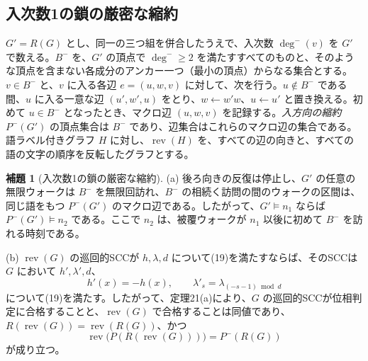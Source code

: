 \documentclass[11pt,reqno]{amsart}
\theoremstyle{definition}
\newtheorem{lemma}[theorem]{補題}
\theoremstyle{definition}
\theoremstyle{remark}
\begin{document}
\subsection{入次数1の鎖の厳密な縮約}\label{sec:F.2}

\(G'=R(G)\) とし、同一の三つ組を併合したうえで、入次数 \(\deg^-(v)\) を \(G'\) で数える。\(B^-\) を、\(G'\) の頂点で \(\deg^-\ge2\) を満たすすべてのものと、そのような頂点を含まない各成分のアンカー一つ（最小の頂点）からなる集合とする。\(v\in B^-\) と、\(v\) に入る各辺 \(e=(u,w,v)\) に対して、次を行う。\(u\notin B^-\) である間、\(u\) に入る一意な辺 \((u',w',u)\) をとり、\(w\leftarrow w'w\)、\(u\leftarrow u'\) と置き換える。初めて \(u\in B^-\) となったとき、マクロ辺 \((u,w,v)\) を記録する。\emph{入方向の縮約} \(P^-(G')\) の頂点集合は \(B^-\) であり、辺集合はこれらのマクロ辺の集合である。語ラベル付きグラフ \(H\) に対し、\(\operatorname{rev}(H)\) を、すべての辺の向きと、すべての語の文字の順序を反転したグラフとする。

\begin{samepage}
\begin{lemma}[入次数1の鎖の厳密な縮約]\leavevmode\label{thm:75}
(a) 後ろ向きの反復は停止し、\(G'\) の任意の無限ウォークは \(B^-\) を無限回訪れ、\(B^-\) の相続く訪問の間のウォークの区間は、同じ語をもつ \(P^-(G')\) のマクロ辺である。したがって、\(G'\models n_1\) ならば \(P^-(G')\models n_2\) である。ここで \(n_2\) は、被覆ウォークが \(n_1\) 以後に初めて \(B^-\) を訪れる時刻である。

(b) \(\operatorname{rev}(G)\) の巡回的SCCが \(h,\lambda,d\) について(19)を満たすならば、そのSCCは \(G\) において \(h',\lambda',d\)、
\[
h'(x)=-h(x),\qquad \lambda'_s=\lambda_{(-s-1)\bmod d}
\]
について(19)を満たす。したがって、定理21(a)により、\(G\) の巡回的SCCが位相判定に合格することと、\(\operatorname{rev}(G)\) で合格することは同値であり、\(R(\operatorname{rev}(G))=\operatorname{rev}(R(G))\)、かつ
\[
\operatorname{rev}\bigl(P(R(\operatorname{rev}(G)))\bigr)=P^-(R(G))
\]
が成り立つ。
\label{thm-end:75}
\end{lemma}
\end{samepage}
\end{document}
